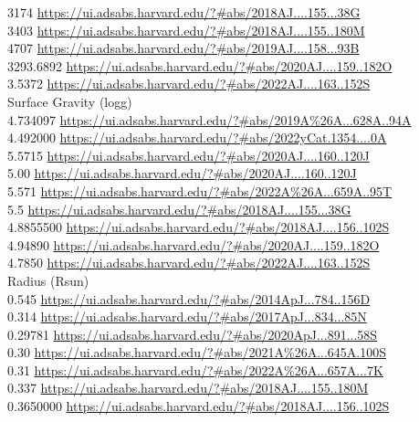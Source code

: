 3174 \url{https://ui.adsabs.harvard.edu/?#abs/2018AJ....155...38G}\\
3403 \url{https://ui.adsabs.harvard.edu/?#abs/2018AJ....155..180M}\\
4707 \url{https://ui.adsabs.harvard.edu/?#abs/2019AJ....158...93B}\\
3293.6892 \url{https://ui.adsabs.harvard.edu/?#abs/2020AJ....159..182O}\\
3.5372 \url{https://ui.adsabs.harvard.edu/?#abs/2022AJ....163..152S}\\
Surface Gravity (logg)\\
4.734097 \url{https://ui.adsabs.harvard.edu/?#abs/2019A%26A...628A..94A}\\
4.492000 \url{https://ui.adsabs.harvard.edu/?#abs/2022yCat.1354....0A}\\
5.5715 \url{https://ui.adsabs.harvard.edu/?#abs/2020AJ....160..120J}\\
5.00 \url{https://ui.adsabs.harvard.edu/?#abs/2020AJ....160..120J}\\
5.571 \url{https://ui.adsabs.harvard.edu/?#abs/2022A%26A...659A..95T}\\
5.5 \url{https://ui.adsabs.harvard.edu/?#abs/2018AJ....155...38G}\\
4.8855500 \url{https://ui.adsabs.harvard.edu/?#abs/2018AJ....156..102S}\\
4.94890 \url{https://ui.adsabs.harvard.edu/?#abs/2020AJ....159..182O}\\
4.7850 \url{https://ui.adsabs.harvard.edu/?#abs/2022AJ....163..152S}\\
Radius (Rsun)\\
0.545 \url{https://ui.adsabs.harvard.edu/?#abs/2014ApJ...784..156D}\\
0.314 \url{https://ui.adsabs.harvard.edu/?#abs/2017ApJ...834...85N}\\
0.29781 \url{https://ui.adsabs.harvard.edu/?#abs/2020ApJ...891...58S}\\
0.30 \url{https://ui.adsabs.harvard.edu/?#abs/2021A%26A...645A.100S}\\
0.31 \url{https://ui.adsabs.harvard.edu/?#abs/2022A%26A...657A...7K}\\
0.337 \url{https://ui.adsabs.harvard.edu/?#abs/2018AJ....155..180M}\\
0.3650000 \url{https://ui.adsabs.harvard.edu/?#abs/2018AJ....156..102S}\\